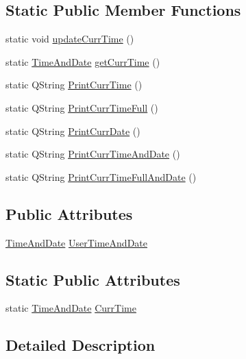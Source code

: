 \subsection*{Static Public Member Functions}
\begin{DoxyCompactItemize}
\item 
static void \hyperlink{classMattyTime_a52a7500e419fe56d10ddf2715fc96d06}{update\+Curr\+Time} ()
\item 
static \hyperlink{structTimeAndDate}{Time\+And\+Date} \hyperlink{classMattyTime_a64fff9c9a7da58881a4c0cc1a2ac84f7}{get\+Curr\+Time} ()
\item 
static Q\+String \hyperlink{classMattyTime_ac5ecfd2ff5329b3476906b39bbf02ae3}{Print\+Curr\+Time} ()
\item 
static Q\+String \hyperlink{classMattyTime_a9d3500ad88197ee8e2db9f36aec1a266}{Print\+Curr\+Time\+Full} ()
\item 
static Q\+String \hyperlink{classMattyTime_af87198affde58c9f254dbf1601fb9f1e}{Print\+Curr\+Date} ()
\item 
static Q\+String \hyperlink{classMattyTime_a96805256f90a469aa22824a1e2dd219d}{Print\+Curr\+Time\+And\+Date} ()
\item 
static Q\+String \hyperlink{classMattyTime_a82a6b06fa496b4d0f9b8d6e11d5b03c8}{Print\+Curr\+Time\+Full\+And\+Date} ()
\end{DoxyCompactItemize}
\subsection*{Public Attributes}
\begin{DoxyCompactItemize}
\item 
\hyperlink{structTimeAndDate}{Time\+And\+Date} \hyperlink{classMattyTime_a7a1ceab576011e56405b49d7bd81e475}{User\+Time\+And\+Date}
\end{DoxyCompactItemize}
\subsection*{Static Public Attributes}
\begin{DoxyCompactItemize}
\item 
static \hyperlink{structTimeAndDate}{Time\+And\+Date} \hyperlink{classMattyTime_a458337456f43243073ae78976e86618f}{Curr\+Time}
\end{DoxyCompactItemize}


\subsection{Detailed Description}


